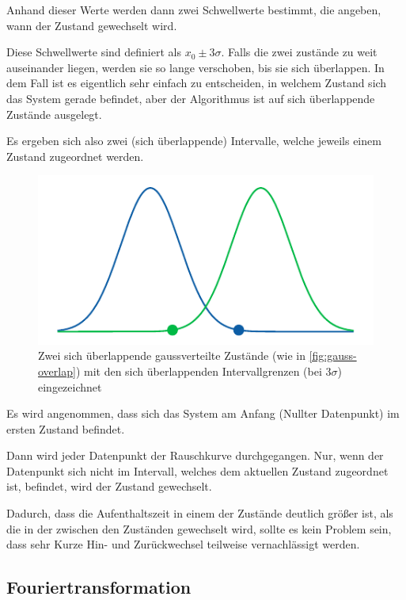 \documentclass[main.tex]{subfiles}
\begin{document}
Anhand dieser Werte werden dann zwei Schwellwerte bestimmt, die angeben, wann der Zustand gewechselt wird.

Diese Schwellwerte sind definiert als \(x_0 \pm 3\sigma\). Falls die zwei zustände zu weit auseinander liegen, werden sie so lange verschoben, bis sie sich überlappen. 
In dem Fall ist es eigentlich sehr einfach zu entscheiden, in welchem Zustand sich das System gerade befindet, aber der Algorithmus ist auf sich überlappende Zustände ausgelegt.

Es ergeben sich also zwei (sich überlappende) Intervalle, welche jeweils einem Zustand zugeordnet werden.

\begin{figure}[h]
    \centering
    \includegraphics{bilder/plots/theo-vis/bounds.pdf}
    \caption{Zwei sich überlappende gaussverteilte Zustände (wie in \cref{fig:gauss-overlap}) mit den sich überlappenden Intervallgrenzen (bei \(3\sigma\)) eingezeichnet }
\end{figure}


Es wird angenommen, dass sich das System am Anfang (Nullter Datenpunkt) im ersten Zustand befindet.

Dann wird jeder Datenpunkt der Rauschkurve durchgegangen. Nur, wenn der Datenpunkt sich nicht im Intervall, welches dem aktuellen Zustand zugeordnet ist, befindet, wird der Zustand gewechselt. 


Dadurch, dass die Aufenthaltszeit in einem der Zustände deutlich größer ist, als die in der zwischen den Zuständen gewechselt wird, sollte es kein Problem sein, dass sehr Kurze Hin- und Zurückwechsel teilweise vernachlässigt werden. 



\subsection{Fouriertransformation}
\end{document}
